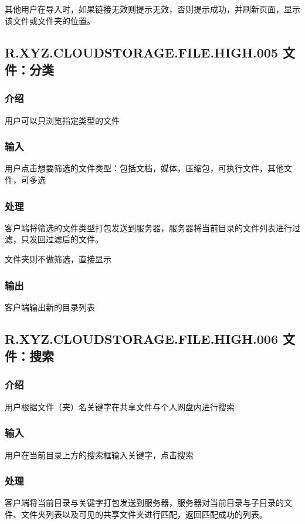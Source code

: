 其他用户在导入时，如果链接无效则提示无效，否则提示成功，并刷新页面，显示该文件或文件夹的位置。



\subsection{R.XYZ.CLOUDSTORAGE.FILE.HIGH.005 文件：分类}

\subsubsection{介绍}
用户可以只浏览指定类型的文件

\subsubsection{输入} 
用户点击想要筛选的文件类型：包括文档，媒体，压缩包，可执行文件，其他文件，可多选

\subsubsection{处理} 
客户端将筛选的文件类型打包发送到服务器，服务器将当前目录的文件列表进行过滤，只发回过滤后的文件。

文件夹则不做筛选，直接显示

\subsubsection{输出} 
客户端输出新的目录列表


\subsection{R.XYZ.CLOUDSTORAGE.FILE.HIGH.006 文件：搜索}

\subsubsection{介绍}
用户根据文件（夹）名关键字在共享文件与个人网盘内进行搜索

\subsubsection{输入} 
用户在当前目录上方的搜索框输入关键字，点击搜索

\subsubsection{处理} 
客户端将当前目录与关键字打包发送到服务器，服务器对当前目录与子目录的文件、文件夹列表以及可见的共享文件夹进行匹配，返回匹配成功的列表。


